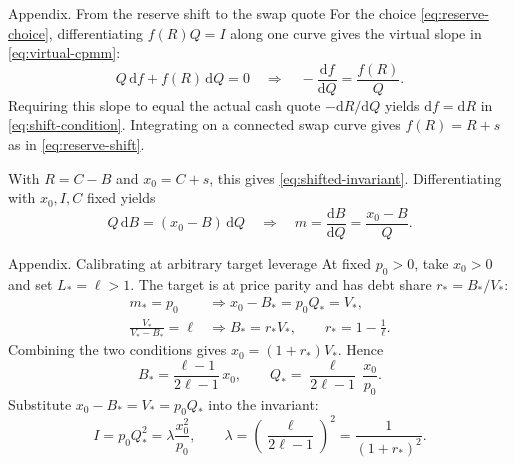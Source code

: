 \documentclass[aspectratio=169,11pt]{beamer}
\begin{document}
\begin{frame}{Appendix. From the reserve shift to the swap quote}
  For the choice \eqref{eq:reserve-choice}, differentiating $f(R)Q=I$
  along one curve gives the virtual slope in \eqref{eq:virtual-cpmm}:
  \begin{equation}\label{eq:app-virtual-slope}
    Q\,\mathrm df+f(R)\,\mathrm dQ=0
    \quad\Longrightarrow\quad
    -\frac{\mathrm df}{\mathrm dQ}=\frac{f(R)}{Q}.
  \end{equation}
  Requiring this slope to equal the actual cash quote
  $-\mathrm dR/\mathrm dQ$ yields $\mathrm df=\mathrm dR$
  in \eqref{eq:shift-condition}. Integrating on a connected swap curve
  gives $f(R)=R+s$ as in \eqref{eq:reserve-shift}.

  With $R=C-B$ and $x_0=C+s$, this gives \eqref{eq:shifted-invariant}.
  Differentiating with $x_0,I,C$ fixed yields
  \begin{equation}\label{eq:app-shifted-price}
    Q\,\mathrm dB=(x_0-B)\,\mathrm dQ
    \quad\Longrightarrow\quad
    m=\frac{\mathrm dB}{\mathrm dQ}=\frac{x_0-B}{Q}.
  \end{equation}
\end{frame}

\begin{frame}{Appendix. Calibrating at arbitrary target leverage}
  At fixed $p_0>0$, take $x_0>0$ and set $L_*=\ell>1$. The target
  is at price parity and has debt share $r_*=B_*/V_*$:
  \begin{align}
    m_*=p_0 &\Longrightarrow x_0-B_*=p_0Q_*=V_*,
    \label{eq:app-target-price}\\
    \frac{V_*}{V_*-B_*}=\ell &\Longrightarrow
    B_*=r_*V_*,\qquad r_*=1-\frac1\ell.
    \label{eq:app-target-leverage}
  \end{align}
  Combining the two conditions gives $x_0=(1+r_*)V_*$. Hence
  \begin{equation}\label{eq:app-target-balances}
    B_*=\frac{\ell-1}{2\ell-1}\,x_0,\qquad
    Q_*=\frac{\ell}{2\ell-1}\,\frac{x_0}{p_0}.
  \end{equation}
  Substitute $x_0-B_*=V_*=p_0Q_*$ into the invariant:
  \begin{equation}\label{eq:app-calibration}
    I=p_0Q_*^2=\lambda\frac{x_0^2}{p_0},
    \qquad \lambda=\left(\frac{\ell}{2\ell-1}\right)^2
    =\frac{1}{(1+r_*)^2}.
  \end{equation}
\end{frame}
\end{document}
